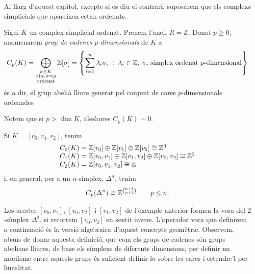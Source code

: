 \documentclass[../main.tex]{subfiles}
\begin{document}
Al llarg d'aquest capítol, excepte si es diu el contrari, suposarem que els complexs simplicials que apareixen estan ordenats.


\begin{defi}
Sigui $K$ un complex simplicial ordenat. Prenem l'anell $R = \mathbb{Z}$. Donat $p\geq 0$, anomenarem \textit{grup de cadenes $p$-dimensionals} de $K$ a 
\begin{equation}
    \notag
    C_p(K) = \bigoplus_{\substack{\sigma\in K\\\dim\sigma=p\\\text{ordenat}}}\mathbb{Z}[\sigma] = \left\{
    \sum_{i=1}^n\lambda_i\sigma_i\;:\;\lambda_i\in\mathbb{Z},\;\sigma_i\;\text{símplex ordenat $p$-dimensional}
    \right\}
\end{equation}
és a dir, el grup abelià lliure generat pel conjunt de cares $p$-dimensionals ordenades
\end{defi}

Notem que si $p>\dim K$, aleshores $C_p(K) = 0$.

\begin{ej}
Si $K = [v_0,v_1,v_2]$, tenim
\begin{equation}
    \notag
    \begin{array}{ll}
        C_0(K) = \mathbb{Z}[v_0]\oplus\mathbb{Z}[v_1]\oplus\mathbb{Z}[v_2]\cong\mathbb{Z}^3\\
        C_1(K) = \mathbb{Z}[v_0,v_1]\oplus\mathbb{Z}[v_1,v_2]\oplus\mathbb{Z}[v_0,v_2]\cong\mathbb{Z}^3\\
        C_2(K)= \mathbb{Z}[v_0,v_1,v_2]\cong\mathbb{Z}
    \end{array}
\end{equation}
i, en general, per a un $n$-símplex, $\Delta^n$, tenim 
\begin{equation}
    \notag
    C_p(\Delta^n) \cong \mathbb{Z}^{\binom{n+1}{p+1}}\qquad p\leq n.
\end{equation}
\end{ej}

Les arestes $[v_0,v_1]$, $[v_0,v_2]$ i $[v_1,v_2]$ de l'exemple anterior formen la vora del $2$-símplex $\Delta^2$, si recorrem $[v_0,v_2]$ en sentit invers. L'operador vora que definirem a continuació és la versió algebraica d'aquest concepte geomètric. Observem, abans de donar aquesta definició, que com els grups de cadenes són grups abelians lliures, de base els símplexs de diferents dimensions, per definir un morfisme entre aquests grups és suficient definir-lo sobre les cares i estendre'l per linealitat.
\end{document}
